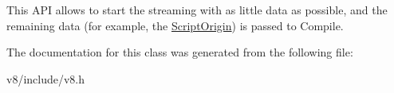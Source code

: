 This A\+PI allows to start the streaming with as little data as possible, and the remaining data (for example, the \mbox{\hyperlink{classv8_1_1ScriptOrigin}{Script\+Origin}}) is passed to Compile. 

The documentation for this class was generated from the following file\+:\begin{DoxyCompactItemize}
\item 
v8/include/v8.\+h\end{DoxyCompactItemize}
